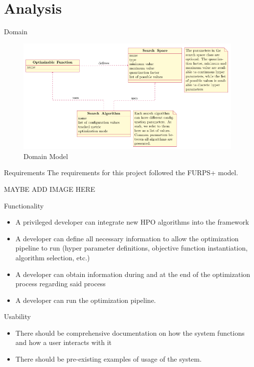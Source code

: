 \documentclass[10pt]{beamer}
\begin{document}
  \section{Analysis}
  \begin{frame}{Domain}
    \begin{figure}
      \includegraphics[width=\textwidth]{images/domain_model.png}
      \caption*{Domain Model}
    \end{figure}
  \end{frame}
  \begin{frame}{Requirements}
    The requirements for this project followed the FURPS+ model.

    MAYBE ADD IMAGE HERE
  \end{frame}
  \begin{frame}{Functionality}
    \begin{itemize}
      \item A privileged developer can integrate new HPO algorithms into the framework
      \item A developer can define all necessary information to allow the optimization pipeline to run (hyper parameter definitions, objective function instantiation, algorithm selection, etc.)
      \item A developer can obtain information during and at the end of the optimization process regarding said process
      \item A developer can run the optimization pipeline.
    \end{itemize}
  \end{frame}
  \begin{frame}{Usability}
    \begin{itemize}
      \item There should be comprehensive documentation on how the system functions and how a user interacts with it
      \item There should be pre-existing examples of usage of the system.
    \end{itemize}
  \end{frame}
\end{document}

